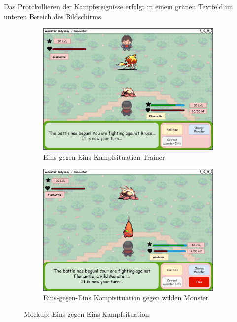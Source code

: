 Das Protokollieren der Kampfereignisse erfolgt in einem grünen Textfeld im unteren Bereich des Bildschirms. 
\begin{figure}[H]
    \centering
    \begin{subfigure}[b]{0.4\textwidth}
        \includegraphics[width=\textwidth]{images/mockups/Encounter/Encounter1v1.png}
        \caption{Eins-gegen-Eins Kampfsituation Trainer}
        \label{fig: Eins-gegen-Eins Kampfsituation Trainer}
    \end{subfigure}
    \hfill
    \begin{subfigure}[b]{0.4\textwidth}
        \includegraphics[width=\textwidth]{images/mockups/Encounter/EncounterWild.png}
        \caption{Eins-gegen-Eins Kampfsituation gegen wilden Monster}
        \label{fig: Eins-gegen-Eins Kampfsituation gegen wilden Monster}
    \end{subfigure}
    \caption{Mockup: Eins-gegen-Eins Kampfsituation}
    \label{fig: Eins-gegen-Eins Kampfsituation}
\end{figure}
